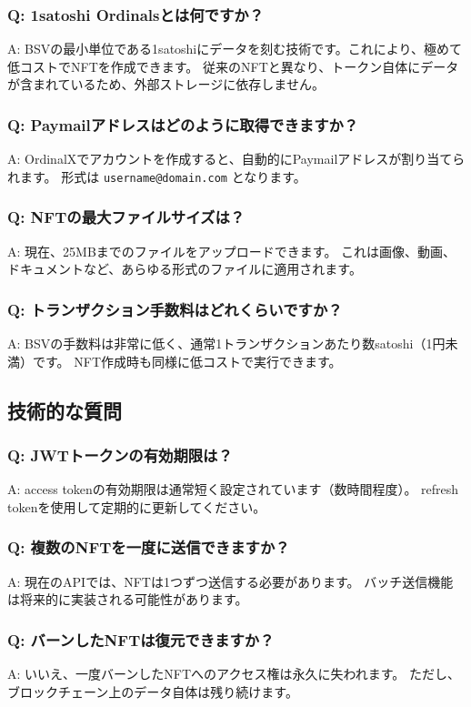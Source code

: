 \documentclass[11pt,a4paper]{ltjsarticle}  %
\begin{document}
\subsubsection{Q: 1satoshi Ordinalsとは何ですか？}
A: BSVの最小単位である1satoshiにデータを刻む技術です。これにより、極めて低コストでNFTを作成できます。
従来のNFTと異なり、トークン自体にデータが含まれているため、外部ストレージに依存しません。

\subsubsection{Q: Paymailアドレスはどのように取得できますか？}
A: OrdinalXでアカウントを作成すると、自動的にPaymailアドレスが割り当てられます。
形式は \texttt{username@domain.com} となります。

\subsubsection{Q: NFTの最大ファイルサイズは？}
A: 現在、25MBまでのファイルをアップロードできます。
これは画像、動画、ドキュメントなど、あらゆる形式のファイルに適用されます。

\subsubsection{Q: トランザクション手数料はどれくらいですか？}
A: BSVの手数料は非常に低く、通常1トランザクションあたり数satoshi（1円未満）です。
NFT作成時も同様に低コストで実行できます。

\subsection{技術的な質問}

\subsubsection{Q: JWTトークンの有効期限は？}
A: access tokenの有効期限は通常短く設定されています（数時間程度）。
refresh tokenを使用して定期的に更新してください。

\subsubsection{Q: 複数のNFTを一度に送信できますか？}
A: 現在のAPIでは、NFTは1つずつ送信する必要があります。
バッチ送信機能は将来的に実装される可能性があります。

\subsubsection{Q: バーンしたNFTは復元できますか？}
A: いいえ、一度バーンしたNFTへのアクセス権は永久に失われます。
ただし、ブロックチェーン上のデータ自体は残り続けます。
\end{document}
